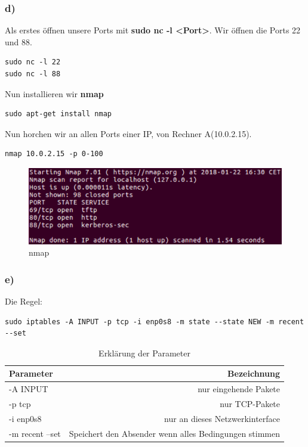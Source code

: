 \subsubsection{d)}
Als erstes öffnen unsere Ports mit \textbf{sudo nc -l <Port>}.
Wir öffnen die Ports 22 und 88. 
\begin{lstlisting}
sudo nc -l 22
sudo nc -l 88 
\end{lstlisting}
Nun installieren wir \textbf{nmap}
\begin{lstlisting}
sudo apt-get install nmap 
\end{lstlisting}
Nun horchen wir an allen Ports einer IP, von Rechner A(10.0.2.15).
\begin{lstlisting}
nmap 10.0.2.15 -p 0-100
\end{lstlisting}
\begin{figure}[H]
	\centering
	\includegraphics[width=0.8 \linewidth]{images/f01}
	\caption{nmap} \label{ordner}
\end{figure} 

\subsubsection{e)}
Die Regel:
\begin{lstlisting}
sudo iptables -A INPUT -p tcp -i enp0s8 -m state --state NEW -m recent --set
\end{lstlisting}
\begin{table}[h!]
  \begin{center}
  \caption{Erklärung der Parameter}
    \label{tab:table1}
    \begin{tabular}{l|r} 
      \textbf{Parameter} & \textbf{Bezeichnung}\\
      \hline
      -A INPUT & nur eingehende Pakete\\
      -p tcp & nur TCP-Pakete\\
      -i enp0s8 & nur an dieses Netzwerkinterface\\
      -m recent --set & Speichert den Absender wenn alles Bedingungen stimmen\\
    \end{tabular}
  \end{center}
\end{table}
	
